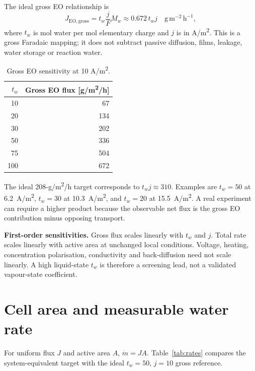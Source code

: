 \documentclass[10pt,a4paper]{article}
\begin{document}
The ideal gross EO relationship is
\[
J_{\mathrm{EO,gross}}=t_w\frac{j}{F}M_w
\approx0.672\,t_wj\quad\mathrm{g\,m^{-2}\,h^{-1}},
\]
where $t_w$ is mol water per mol elementary charge and $j$ is in
A/m\textsuperscript{2}. This is a gross Faradaic mapping; it does not subtract
passive diffusion, films, leakage, water storage or reaction water.

\begin{table}[htbp]
\centering
\caption{Gross EO sensitivity at 10 A/m\textsuperscript{2}.}
\begin{tabular}{@{}rr@{}}
\toprule
$t_w$ & Gross EO flux [g/m\textsuperscript{2}/h] \\
\midrule
10 & 67 \\
20 & 134 \\
30 & 202 \\
50 & 336 \\
75 & 504 \\
100 & 672 \\
\bottomrule
\end{tabular}
\end{table}

The ideal 208-g/m\textsuperscript{2}/h target corresponds to $t_wj\approx310$.
Examples are $t_w=50$ at 6.2~A/m\textsuperscript{2}, $t_w=30$ at
10.3~A/m\textsuperscript{2}, and $t_w=20$ at 15.5~A/m\textsuperscript{2}.
A real experiment can require a higher product because the observable net flux
is the gross EO contribution minus opposing transport.

\begin{plainbox}
\textbf{First-order sensitivities.} Gross flux scales linearly with $t_w$ and
$j$. Total rate scales linearly with active area at unchanged local conditions.
Voltage, heating, concentration polarisation, conductivity and back-diffusion
need not scale linearly. A high liquid-state $t_w$ is therefore a screening
lead, not a validated vapour-state coefficient.
\end{plainbox}

\section{Cell area and measurable water rate}

For uniform flux $J$ and active area $A$, $\dot m=JA$. Table~\ref{tab:rates}
compares the system-equivalent target with the ideal $t_w=50$, $j=10$ gross
reference.
\end{document}
